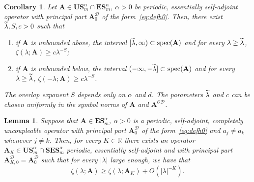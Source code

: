 \documentclass[10pt]{amsart}
\newtheorem{lemm}[theo]{Lemma}\newtheorem{prop}[theo]{Proposition}\newtheorem{coro}[theo]{Corollary}\newtheorem{conj}[theo]{Conjecture}
\theoremstyle{definition}\newtheorem{defi}[theo]{Definition}\newtheorem{rema}[theo]{Remark}\newtheorem{exam}[theo]{Example}\newtheorem{nota}[theo]{Notation}
\DeclareMathOperator{\spec}{spec}
\newcommand{\R}{\mathbb R}
\newcommand{\CD}{\mathcal{D}}
\newcommand{\CO}{\mathcal{O}}
\newcommand{\BA}{\mathbf A}
\newcommand{\BE}{\mathbf E}
\newcommand{\BS}{\mathbf S}
\newcommand{\BU}{\mathbf U}
\newcommand{\bigo}[1]{O\left(#1 \right)}
\newcommand{\abs}[1]{\left\lvert #1 \right\rvert}
\let\oldtilde\tilde
\renewcommand*{\tilde}[1]{\mathchoice{\widetilde{#1}}{\widetilde{#1}}{\oldtilde{#1}}{\oldtilde{#1}}}
\begin{document}
\begin{coro}\label{cor:uncoupledbs}
Let $\BA \in \BU\BS^\alpha_m \cap \BE\BS_m^\alpha$, $\alpha > 0$ be periodic, essentially self-adjoint operator with principal part $\BA_0^\CD$ of the form~\eqref{eq:defh0}. Then, there exist $\tilde \lambda, S,c > 0$ such that
\begin{enumerate}
\item \label{it:bsposuc}
if $\BA$ is unbounded above, the interval $[\tilde \lambda,\infty) \subset
\spec(\BA)$ and for every $\lambda \ge \tilde \lambda$, $\zeta(\lambda;\BA) \ge c
\lambda^{-S}$;
\item \label{it:bsneguc}
if $\BA$ is unbounded below, the interval $(- \infty,-\tilde \lambda] \subset
\spec(\BA)$ and for every $\lambda \ge \tilde \lambda$, $\zeta(-\lambda;\BA) \ge c
\lambda^{-S}$.
\end{enumerate}
The \emph{overlap exponent} $S$ depends only on $\alpha$ and $d$. The parameters $\tilde \lambda$ and $c$ can be chosen uniformly in the symbol norms of $\BA$ and $\BA^{\CO\CD}$.
\end{coro}



\begin{lemm}\label{lem:uncoupledlower}
Suppose that $\BA \in \BE\BS^\alpha_m$, $\alpha > 0$ is a periodic, self-adjoint, completely uncoupleable operator with principal part $\BA_0^\CD$ of the form~\eqref{eq:defh0} and $a_j \ne a_k$ whenever $j \ne k$. Then, for every $K
\in \R$ there exists an operator $\BA_K \in \BU\BS_m^\alpha \cap
\BS\BE\BS_m^\alpha$ periodic, essentially self-adjoint and with principal part $\BA_{K,0}^\CD = \BA_0^\CD$ such that for every $\abs \lambda$ large enough, we have that
\begin{equation}\label{eq:bsequiv}
\zeta(\lambda;\BA)
\ge
\zeta(\lambda;\BA_K) + \bigo{\abs{\lambda}^{-K}}.
\end{equation}
\end{lemm}
\end{document}
